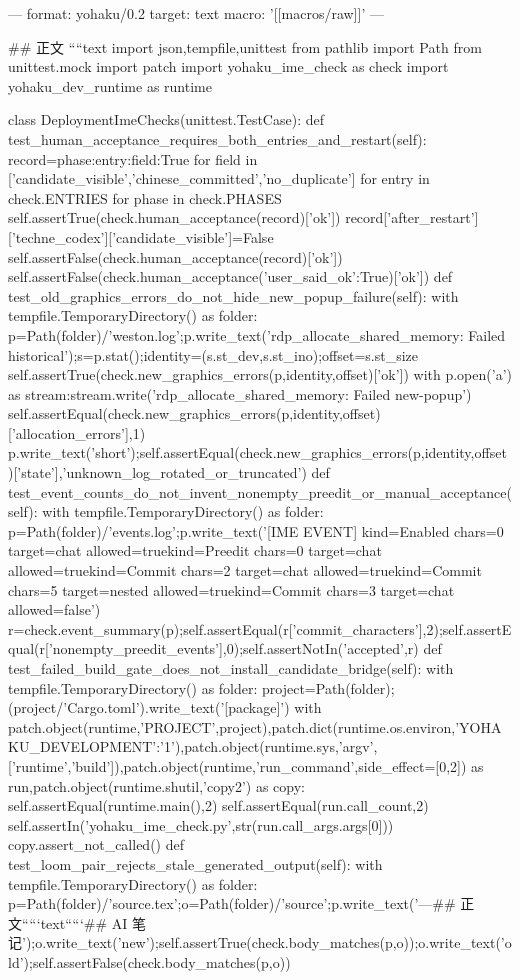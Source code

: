 ---
format: yohaku/0.2
target: text
macro: '[[macros/raw]]'
---

## 正文
````text
import json,tempfile,unittest
from pathlib import Path
from unittest.mock import patch
import yohaku_ime_check as check
import yohaku_dev_runtime as runtime

class DeploymentImeChecks(unittest.TestCase):
    def test_human_acceptance_requires_both_entries_and_restart(self):
        record={phase:{entry:{field:True for field in ['candidate_visible','chinese_committed','no_duplicate']} for entry in check.ENTRIES} for phase in check.PHASES}
        self.assertTrue(check.human_acceptance(record)['ok'])
        record['after_restart']['techne_codex']['candidate_visible']=False
        self.assertFalse(check.human_acceptance(record)['ok'])
        self.assertFalse(check.human_acceptance({'user_said_ok':True})['ok'])
    def test_old_graphics_errors_do_not_hide_new_popup_failure(self):
        with tempfile.TemporaryDirectory() as folder:
            p=Path(folder)/'weston.log';p.write_text('rdp_allocate_shared_memory: Failed historical\n');s=p.stat();identity=(s.st_dev,s.st_ino);offset=s.st_size
            self.assertTrue(check.new_graphics_errors(p,identity,offset)['ok'])
            with p.open('a') as stream:stream.write('rdp_allocate_shared_memory: Failed new-popup\n')
            self.assertEqual(check.new_graphics_errors(p,identity,offset)['allocation_errors'],1)
            p.write_text('short');self.assertEqual(check.new_graphics_errors(p,identity,offset)['state'],'unknown_log_rotated_or_truncated')
    def test_event_counts_do_not_invent_nonempty_preedit_or_manual_acceptance(self):
        with tempfile.TemporaryDirectory() as folder:
            p=Path(folder)/'events.log';p.write_text('[IME EVENT] kind=Enabled chars=0 target=chat allowed=true kind=Preedit chars=0 target=chat allowed=true kind=Commit chars=2 target=chat allowed=true kind=Commit chars=5 target=nested allowed=true kind=Commit chars=3 target=chat allowed=false\n')
            r=check.event_summary(p);self.assertEqual(r['commit_characters'],2);self.assertEqual(r['nonempty_preedit_events'],0);self.assertNotIn('accepted',r)
    def test_failed_build_gate_does_not_install_candidate_bridge(self):
        with tempfile.TemporaryDirectory() as folder:
            project=Path(folder);(project/'Cargo.toml').write_text('[package]')
            with patch.object(runtime,'PROJECT',project),patch.dict(runtime.os.environ,{'YOHAKU_DEVELOPMENT':'1'}),patch.object(runtime.sys,'argv',['runtime','build']),patch.object(runtime,'run_command',side_effect=[0,2]) as run,patch.object(runtime.shutil,'copy2') as copy:
                self.assertEqual(runtime.main(),2)
                self.assertEqual(run.call_count,2)
                self.assertIn('yohaku_ime_check.py',str(run.call_args.args[0]))
                copy.assert_not_called()
    def test_loom_pair_rejects_stale_generated_output(self):
        with tempfile.TemporaryDirectory() as folder:
            p=Path(folder)/'source.tex';o=Path(folder)/'source';p.write_text('---\n## 正文\n`````text\nnew\n`````\n## AI 笔记\n');o.write_text('new\n');self.assertTrue(check.body_matches(p,o));o.write_text('old\n');self.assertFalse(check.body_matches(p,o))

